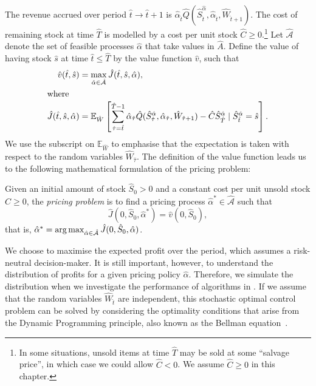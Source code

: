 \documentclass[main.tex]{subfiles}
\begin{document}
The revenue accrued over period $\hat{t}\to \hat{t}+1$ is
$\hat{\alpha}_{\hat{t}}\hat{Q}(\hat{S}_{\hat{t}}^{\hat{\alpha}},\hat{\alpha}_{\hat{t}},\hat{W}_{\hat{t}+1})$.
The cost of remaining stock at time $\hat{T}$ is modelled by a cost per unit
stock $\hat{C}\geq 0$.\footnote{In some situations, unsold items at time $\hat{T}$
  may be sold at some ``salvage price'', in which case we could allow
  $\hat{C}<0$. We assume $\hat{C}\geq 0$ in this chapter.}
Let $\hat{\mathcal{A}}$ denote the set of feasible processes $\hat{\alpha}$ that take values
in $\hat{A}$.
Define the value of having stock $\hat{s}$ at time $\hat{t}\leq \hat{T}$
by the value function $\hat{v}$, such that
\begin{align}\label{eq:value_function_def}
  \hat{v}(\hat{t},\hat{s})&=\max_{\hat{\alpha}\in\hat{\mathcal{A}}}
                            \hat{J}(\hat{t},\hat{s},\hat{\alpha}),\\
  \intertext{where}
  \hat{J}(\hat{t},\hat{s},\hat{\alpha})&=
                                         \mathbb{E}_{\hat{W}}\left[ \sum_{\hat{\tau}=\hat{t}}^{\hat{T}-1}
                                         \hat{\alpha}_{\hat{\tau}} \hat{Q}(\hat{S}_{\hat{\tau}}^{\hat{\alpha}},\hat{\alpha}_{\hat{\tau}},\hat{W}_{\hat{\tau}+1})
                                         - \hat{C}\hat{S}_{\hat{T}}^{\hat{\alpha}} \mid \hat{S}_{\hat{t}}^{\hat{\alpha}} = \hat{s}
                                         \right].
                                         \label{eq:value_function_def2}
\end{align}
We use the subscript on $\mathbb{E}_{\hat{W}}$ to emphasise that the
expectation is taken with respect to the random variables $\hat{W}_{\hat{\tau}}$.
The definition of the value function leads us to the following mathematical formulation of the pricing
problem:
\begin{mydef}
  Given an initial amount of stock $\hat{S}_0>0$ and a constant cost
  per unit unsold stock $\hat{C}\geq 0$, the \emph{pricing problem} is
  to find a pricing process $\hat{\alpha}^*\in\hat{\mathcal{A}}$ such
  that
  \begin{equation}
    \hat{J}(0,\hat{S}_0,\hat{\alpha}^*) = \hat{v}(0,\hat{S}_0),
  \end{equation}
  that is, $\hat{\alpha}^* = \operatorname*{arg\,max}_{\hat{\alpha}\in\hat{\mathcal{A}}}\hat{J}(0,\hat{S}_0,\hat{\alpha})$.
\end{mydef}
We choose to maximise the expected profit over the period, which
assumes a risk-neutral decision-maker.
It is still
important, however,
to understand the distribution of profits for a given pricing policy
$\hat{\alpha}$. Therefore, we simulate the distribution when
we investigate the performance of algorithms in
.
If we assume that the random variables $\hat{W}_{\hat{t}}$ are independent, this
stochastic optimal control problem can be solved by
considering the optimality conditions that arise from the Dynamic
Programming principle, also known as the Bellman equation~\citep{bertsekas2005dynamic}.
\end{document}
